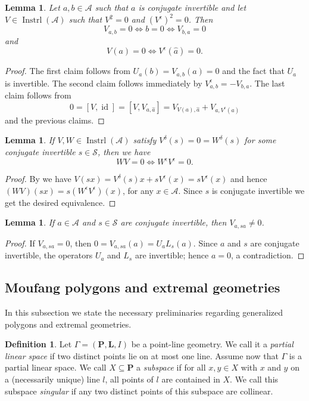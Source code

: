 \documentclass[oneside,a4paper]{amsart} %
\newtheorem{lemma}[theorem]{Lemma}
\theoremstyle{definition}
\newtheorem{definition}[theorem]{Definition}
\DeclareMathOperator{\Inst}{Instrl}
\DeclareMathOperator{\id}{id}
\newcommand{\A}{\mathcal{A}}
\renewcommand{\SS}{\mathcal{S}}
\numberwithin{equation}{section}
\begin{document}
\begin{lemma}
\label{V equiv with V^epsilon}
	Let $a,b\in \A$ such that $a$ is conjugate invertible and let $V\in \Inst (\A)$ such that $V^2=0$ and $(V^\epsilon)^2=0$. Then
	\[ V_{a,b}=0 \iff b=0 \iff V_{b,a}=0 \]
	and 
	\[ V(a)=0 \iff V^\epsilon (\hat a)=0 .\]
\end{lemma}
\begin{proof}
	The first claim follows from $U_a (b)=V_{a,b}(a)=0$ and the fact that $U_a$ is invertible. The second claim follows immediately by $V_{a,b}^\epsilon =-V_{b,a}$. The last claim follows from 
	\[ 0=[V,\id]=[V,V_{a,\hat a}]=V_{V(a),\hat a}+V_{a,V^\epsilon (\hat a)}\]
	and the previous claims.
\end{proof}

\begin{lemma}
\label{V^2 equiv with (V^epsilon)^2}
	If $V, W\in\Inst (\A)$ satisfy $V^\delta(s)=0=W^\delta (s)$ for some conjugate invertible $s\in\SS$, then we have 
	\[ WV=0\iff W^\epsilon V^\epsilon=0 .\]
\end{lemma}
\begin{proof}
	By \cite[(1.10)]{Allison1984} we have $V(sx)=V^\delta(s)x+sV^\epsilon(x)=sV^\epsilon (x)$ and hence $(WV)(sx)=s(W^\epsilon V^\epsilon)(x)$, for any $x\in\A$.
	Since $s$ is conjugate invertible we get the desired equivalence.
\end{proof}

\begin{lemma}
\label{a invertible V_{a,sa}}	
	If $a\in\A$ and $s\in\SS$ are conjugate invertible, then $V_{a,sa}\neq 0$.
\end{lemma}
\begin{proof}
	If $V_{a,sa}=0$, then $0=V_{a,sa}(a)=U_a L_s(a)$.
	Since $a$ and $s$ are conjugate invertible, the operators $U_a$ and $L_s$ are invertible; hence $a=0$, a contradiction.
\end{proof}


\subsection{Moufang polygons and extremal geometries}

In this subsection we state the necessary preliminaries regarding generalized polygons and extremal geometries.

\begin{definition}
	Let $\Gamma=(\mathbf P,\mathbf L,I)$ be a point-line geometry. 
	We call it a \emph{partial linear space} if two distinct points lie on at most one line.
	Assume now that $\Gamma$ is a partial linear space.
	We call $X\subseteq \mathbf P$ a \textit{subspace} if for all $x, y\in X$ with $x$ and $y$ on a (necessarily unique) line $l$, all points of $l$ are contained in $X$.
	We call this subspace \textit{singular} if any two distinct points of this subspace are collinear.
\end{definition}
\end{document}
